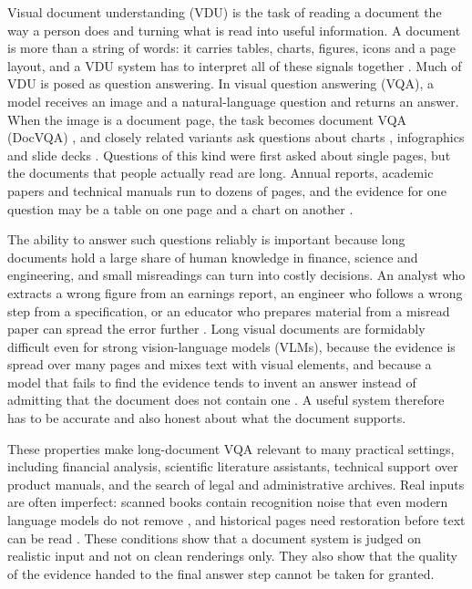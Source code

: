 \documentclass[conference]{IEEEtran}
\begin{document}
Visual document understanding (VDU) is the task of reading a document the way a person does and turning what is read into useful information. A document is more than a string of words: it carries tables, charts, figures, icons and a page layout, and a VDU system has to interpret all of these signals together \cite{huang2022layoutlmv3,kim2022donut}. Much of VDU is posed as question answering. In visual question answering (VQA), a model receives an image and a natural-language question and returns an answer. When the image is a document page, the task becomes document VQA (DocVQA) \cite{mathew2021docvqa}, and closely related variants ask questions about charts \cite{masry2022chartqa}, infographics \cite{mathew2022infographicvqa} and slide decks \cite{tanaka2023slidevqa}. Questions of this kind were first asked about single pages, but the documents that people actually read are long. Annual reports, academic papers and technical manuals run to dozens of pages, and the evidence for one question may be a table on one page and a chart on another \cite{tito2023mpdocvqa,vanlandeghem2023dude}.

The ability to answer such questions reliably is important because long documents hold a large share of human knowledge in finance, science and engineering, and small misreadings can turn into costly decisions. An analyst who extracts a wrong figure from an earnings report, an engineer who follows a wrong step from a specification, or an educator who prepares material from a misread paper can spread the error further \cite{slideagent}. Long visual documents are formidably difficult even for strong vision-language models (VLMs), because the evidence is spread over many pages and mixes text with visual elements, and because a model that fails to find the evidence tends to invent an answer instead of admitting that the document does not contain one \cite{zhu2025doclens,ma2024mmlongbench}. A useful system therefore has to be accurate and also honest about what the document supports.

These properties make long-document VQA relevant to many practical settings, including financial analysis, scientific literature assistants, technical support over product manuals, and the search of legal and administrative archives. Real inputs are often imperfect: scanned books contain recognition noise that even modern language models do not remove \cite{nguyen2025gec}, and historical pages need restoration before text can be read \cite{guan2025preocr}. These conditions show that a document system is judged on realistic input and not on clean renderings only. They also show that the quality of the evidence handed to the final answer step cannot be taken for granted.
\end{document}
